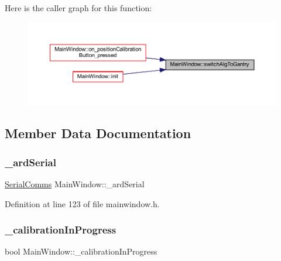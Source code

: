 Here is the caller graph for this function\+:
\nopagebreak
\begin{figure}[H]
\begin{center}
\leavevmode
\includegraphics[width=350pt]{classMainWindow_a28c0f3e2856ce2c44ba3ddad62a302a6_icgraph}
\end{center}
\end{figure}


\subsection{Member Data Documentation}
\mbox{\label{classMainWindow_a06b8d20af620251ae9bb2f4ffea9a472}} 
\subsubsection{\texorpdfstring{\_ardSerial}{\_ardSerial}}
{\footnotesize\ttfamily \mbox{\hyperlink{classSerialComms}{Serial\+Comms}} Main\+Window\+::\+\_\+ard\+Serial\hspace{0.3cm}{\ttfamily [private]}}



Definition at line 123 of file mainwindow.\+h.

\mbox{\label{classMainWindow_a81af7103c9294df962389000354a6ca8}} 
\subsubsection{\texorpdfstring{\_calibrationInProgress}{\_calibrationInProgress}}
{\footnotesize\ttfamily bool Main\+Window\+::\+\_\+calibration\+In\+Progress\hspace{0.3cm}{\ttfamily [private]}}



